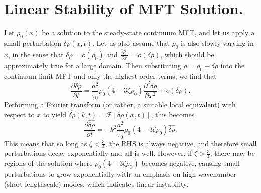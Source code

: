 \documentclass[
reprint, amsmath,amssymb, aps,
 pre, longbibliography,
]{revtex4-1}
\newcommand{\partDeriv}[2]{\frac{\partial #1}{\partial #2}}
\begin{document}
\appendix
\section{Linear Stability of MFT Solution.} Let $\rho_0 (x)$ be a solution to the steady-state continuum MFT, and let us apply a small perturbation $\delta \rho(x, t)$. Let us also assume that $\rho_0$ is also slowly-varying in $x$,
in the sense that $\delta \rho = o(\rho_0)$ and $ \partDeriv{\rho_0}{x} = o(\delta \rho)$, which should be approximately true for a large domain.
Then substituting $\rho = \rho_0 + \delta \rho$ into the continuum-limit MFT and only the highest-order terms, we find that
\begin{equation}
 \partDeriv{\delta \rho}{t} =  \frac{a^2}{\tau_0} \rho_0 (4 - 3 \zeta \rho_0) \partDeriv{^2 \delta \rho}{x^2} + o(\delta \rho).
\end{equation}
Performing a  Fourier transform  (or rather, a suitable local equivalent) with respect to $x$ to yield $\hat{\delta \rho}(k, t) = \mathcal{F}\left[ \delta \rho(x, t) \right]$, this becomes
\begin{equation}
 \partDeriv{\hat{\delta \rho}}{t} = -k^2 \frac{a^2}{\tau_0}\rho_0 (4 - 3 \zeta \rho_0)\hat{\delta \rho}.
\end{equation}
This means that so long as $\zeta < \frac{3}{4}$, the RHS is always negative, and therefore small perturbations decay exponentially and all is well. However, if $\zeta>\frac{3}{4}$, there may be regions of the solution where
$\rho_0 (4 - 3 \zeta \rho_0)$ becomes negative, causing small perturbations to grow exponentially with an emphasis on high-wavenumber (short-lengthscale) modes, which indicates linear instability.
\end{document}
